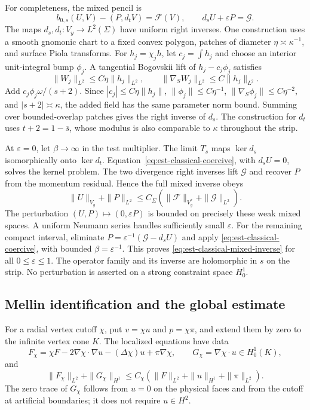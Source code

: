 \documentclass[11pt,a4paper]{article}
\theoremstyle{remark}
\numberwithin{equation}{section}
\begin{document}
For completeness, the mixed pencil is
\begin{equation}\label{eq:est-classical-mixed-pencil}
 b_{0,s}(U,V)-(P,d_tV)=\mathcal F(V),
 \qquad d_sU+\varepsilon P=\mathcal G.
\end{equation}
The maps $d_s,d_t:V_y\to L^2(\Sigma)$ have uniform right inverses.
One construction uses a smooth gnomonic chart to a fixed convex polygon,
patches of diameter $\eta\asymp\kappa^{-1}$, and surface Piola transforms.
For $h_j=\chi_jh$, let $c_j=\int h_j$ and choose an interior unit-integral
bump $\phi_j$. A tangential Bogovskii lift of $h_j-c_j\phi_j$ satisfies
\[
 \|W_j\|_{L^2}\le C\eta\|h_j\|_{L^2},
 \qquad \|\nabla_SW_j\|_{L^2}\le C\|h_j\|_{L^2}.
\]
Add $c_j\phi_j\omega/(s+2)$. Since
$|c_j|\le C\eta\|h_j\|$, $\|\phi_j\|\le C\eta^{-1}$,
$\|\nabla_S\phi_j\|\le C\eta^{-2}$, and
$|s+2|\asymp\kappa$, the added field has the same parameter norm bound.
Summing over bounded-overlap patches gives the right inverse of $d_s$.
The construction for $d_t$ uses $t+2=1-\overline s$, whose modulus is
also comparable to $\kappa$ throughout the strip.

At $\varepsilon=0$, let $\beta\to\infty$ in the test multiplier.
The limit $T_s$ maps $\ker d_s$ isomorphically onto $\ker d_t$.
Equation~\eqref{eq:est-classical-coercive}, with $d_sU=0$, solves the
kernel problem. The two divergence right inverses lift $\mathcal G$ and
recover $P$ from the momentum residual. Hence the full mixed inverse obeys
\begin{equation}\label{eq:est-classical-mixed-inverse}
 \|U\|_{V_y}+\|P\|_{L^2}
 \le C_\Sigma(\|\mathcal F\|_{V_y^*}+\|\mathcal G\|_{L^2}).
\end{equation}
The perturbation $(U,P)\mapsto(0,\varepsilon P)$ is bounded on precisely
these weak mixed spaces. A uniform Neumann series handles sufficiently
small $\varepsilon$. For the remaining compact interval, eliminate
$P=\varepsilon^{-1}(\mathcal G-d_sU)$ and apply
\eqref{eq:est-classical-coercive}, with bounded
$\beta=\varepsilon^{-1}$. This proves
\eqref{eq:est-classical-mixed-inverse} for all $0\le\varepsilon\le1$.
The operator family and its inverse are holomorphic in $s$ on the strip.
No perturbation is asserted on a strong constraint space $H_0^1$.

\subsection{Mellin identification and the global estimate}

For a radial vertex cutoff $\chi$, put $v=\chi u$ and $p=\chi\pi$,
and extend them by zero to the infinite vertex cone $K$. The localized
equations have data
\[
 F_\chi=\chi F-2\nabla\chi\cdot\nabla u-(\Delta\chi)u+\pi\nabla\chi,
 \qquad G_\chi=\nabla\chi\cdot u\in H_0^1(K),
\]
and
\begin{equation}\label{eq:est-classical-local-data}
 \|F_\chi\|_{L^2}+\|G_\chi\|_{H^1}
 \le C_\chi(\|F\|_{L^2}+\|u\|_{H^1}+\|\pi\|_{L^2}).
\end{equation}
The zero trace of $G_\chi$ follows from $u=0$ on the physical faces and
from the cutoff at artificial boundaries; it does not require $u\in H^2$.
\end{document}

